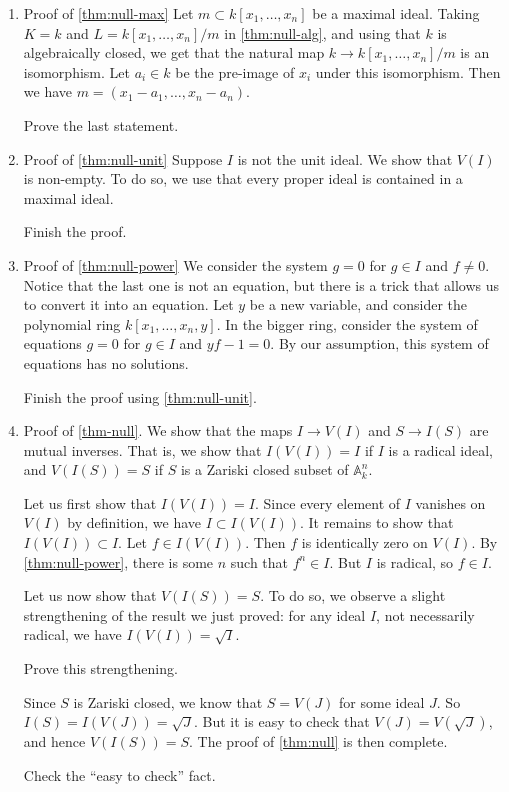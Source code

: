 \documentclass[11pt]{article}
\begin{document}
\begin{enumerate}
\item Proof of \ref{thm:null-max}
\label{sec:orgef7ea0c}
Let \(m \subset k[x_1,\dots,x_n]\) be a maximal ideal.
Taking \(K = k\) and \(L = k[x_1,\dots,x_n]/m\) in \ref{thm:null-alg}, and using that \(k\) is algebraically closed, we get that the natural map \(k \to k[x_1,\dots,x_n]/m\) is an isomorphism.
Let \(a_i \in k\) be the pre-image of \(x_i\) under this isomorphism. 
Then we have \(m = (x_1-a_1,\dots,x_n-a_n)\).
\begin{skipped}
Prove the last statement.
\end{skipped}

\item Proof of \ref{thm:null-unit}
\label{sec:org63fce7a}
Suppose \(I\) is not the unit ideal. We show that \(V(I)\) is non-empty.
To do so, we use that every proper ideal is contained in a maximal ideal.
\begin{skipped}
Finish the proof.
\end{skipped}
\item Proof of \ref{thm:null-power}
\label{sec:orgd4d0bfe}
We consider the system \(g = 0\) for \(g \in I\) and \(f \neq 0\).
Notice that the last one is not an equation, but there is a trick that allows us to convert it into an equation.
Let \(y\) be a new variable, and consider the polynomial ring \(k[x_1,\dots,x_n,y]\).
In the bigger ring, consider the system of equations \(g = 0\) for \(g \in I\) and \(yf - 1 = 0\).
By our assumption, this system of equations has no solutions.
\begin{skipped}
Finish the proof using \ref{thm:null-unit}.
\end{skipped}

\item Proof of \ref{thm-null}.
\label{sec:org35ad2a1}
We show that the maps \(I \to V(I)\) and \(S \to I(S)\) are mutual inverses.
That is, we show that \(I(V(I)) = I\) if \(I\) is a radical ideal, and \(V(I(S)) = S\) if \(S\) is a Zariski closed subset of \(\mathbb A^n_k\).

Let us first show that \(I(V(I)) = I\).
Since every element of \(I\) vanishes on \(V(I)\) by definition, we have \(I \subset I(V(I))\).
It remains to show that \(I(V(I)) \subset I\).
Let \(f \in I(V(I))\).
Then \(f\) is identically zero on \(V(I)\).
By \ref{thm:null-power}, there is some \(n\) such that \(f^n \in I\).
But \(I\) is radical, so \(f \in I\).

Let us now show that \(V(I(S)) = S\).
To do so, we observe a slight strengthening of the result we just proved: for any ideal \(I\), not necessarily radical, we have \(I(V(I)) = \sqrt{I}\). 
\begin{skipped}
Prove this strengthening.
\end{skipped}
Since \(S\) is Zariski closed, we know that \(S = V(J)\) for some ideal \(J\).
So \(I(S) = I(V(J)) = \sqrt{J}.\)
But it is easy to check that \(V(J) = V(\sqrt{J})\), and hence \(V(I(S)) = S\).
The proof of \ref{thm:null} is then complete.
\begin{skipped}
Check the ``easy to check'' fact.
\end{skipped}
\end{enumerate}
\end{document}
